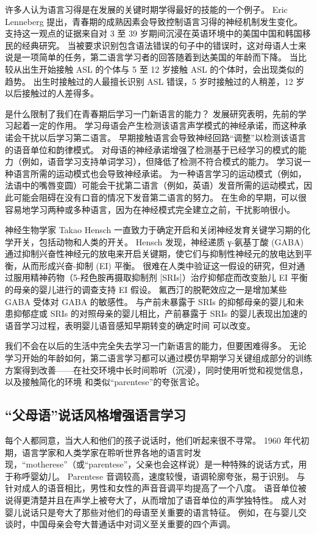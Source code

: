 许多人认为语言习得是在发展的关键时期学得最好的技能的一个例子。 Eric Lenneberg 提出，青春期的成熟因素会导致控制语言习得的神经机制发生变化。 支持这一观点的证据来自对 3 至 39 岁期间沉浸在英语环境中的美国中国和韩国移民的经典研究。 当被要求识别包含语法错误的句子中的错误时，这对母语人士来说是一项简单的任务，第二语言学习者的回答随着到达美国的年龄而下降。 当比较从出生开始接触 ASL 的个体与 5 至 12 岁接触 ASL 的个体时，会出现类似的趋势。 出生时接触过的人最擅长识别 ASL 错误，5 岁时接触过的人稍差，12 岁以后接触过的人差得多。

是什么限制了我们在青春期后学习一门新语言的能力？ 发展研究表明，先前的学习起着一定的作用。 学习母语会产生检测该语言声学模式的神经承诺，而这种承诺会干扰以后学习第二语言。 早期接触语言会导致神经回路“调整”以检测该语言的语音单位和韵律模式。 对母语的神经承诺增强了检测基于已经学习的模式的能力（例如，语音学习支持单词学习），但降低了检测不符合模式的能力。 学习说一种语言所需的运动模式也会导致神经承诺。 为一种语言学习的运动模式（例如，法语中的嘴唇变圆）可能会干扰第二语言（例如，英语）发音所需的运动模式，因此可能会阻碍在没有口音的情况下发音第二语言的努力。 在生命的早期，可以很容易地学习两种或多种语言，因为在神经模式完全建立之前，干扰影响很小。

神经生物学家 Takao Hensch 一直致力于确定开启和关闭神经发育关键学习期的化学开关，包括动物和人类的开关。 Hensch 发现，神经递质 γ-氨基丁酸 (GABA) 通过抑制兴奋性神经元的放电来开启关键期，使它们与抑制性神经元的放电达到平衡，从而形成兴奋-抑制 (EI) 平衡。 很难在人类中验证这一假设的研究，但对通过服用精神药物（5-羟色胺再摄取抑制剂 [SRIs]）治疗抑郁症而改变胎儿 EI 平衡的母亲的婴儿进行的调查支持 EI 假设。 氟西汀的脱靶效应之一是增加某些 GABA 受体对 GABA 的敏感性。 与产前未暴露于 SRIs 的抑郁母亲的婴儿和未患抑郁症或 SRIs 的对照母亲的婴儿相比，产前暴露于 SRIs 的婴儿表现出加速的语音学习过程，表明婴儿语音感知早期转变的确定时间 可以改变。

我们不会在以后的生活中完全失去学习一门新语言的能力，但要困难得多。 无论学习开始的年龄如何，第二语言学习都可以通过模仿早期学习关键组成部分的训练方案得到改善——在社交环境中长时间聆听（沉浸），同时使用听觉和视觉信息，以及接触简化的环境 和类似“parentese”的夸张言论。

\subsection{“父母语”说话风格增强语言学习}
每个人都同意，当大人和他们的孩子说话时，他们听起来很不寻常。 1960 年代初期，语言学家和人类学家在聆听世界各地的语言时发现，“motherese”（或“parentese”，父亲也会这样说）是一种特殊的说话方式，用于称呼婴幼儿。 Parentese 音调较高，速度较慢，语调轮廓夸张，易于识别。 与针对成人的语音相比，男性和女性的声音音调平均提高了一个八度。 语音单位被说得更清楚并且在声学上被夸大了，从而增加了语音单位的声学独特性。 成人对婴儿说话只是夸大了那些对他们的母语至关重要的语言特征。 例如，在与婴儿交谈时，中国母亲会夸大普通话中对词义至关重要的四个声调。


